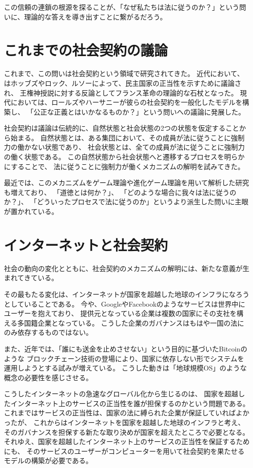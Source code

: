   この信頼の連鎖の根源を探ることが、「なぜ私たちは法に従うのか？」という問いに、理論的な答えを導き出すことに繋がるだろう。
  

  \section{これまでの社会契約の議論} %
  これまで、この問いは社会契約という領域で研究されてきた。
  近代において、はホッブズやロック、ルソーによって、民主国家の正当性を示すために議論され、
  王権神授説に対する反論としてフランス革命の理論的な石杖となった。
  現代においては、ロールズやハーサニーが彼らの社会契約を一般化したモデルを構築し、
  「公正な正義とはいかなるものか？」という問いへの議論に発展した。

  社会契約は議論は伝統的に、自然状態と社会状態の2つの状態を仮定することから始まる。
  自然状態とは、ある集団において、その成員が法に従うことに強制力の働かない状態であり、
  社会状態とは、全ての成員が法に従うことに強制力の働く状態である。
  この自然状態から社会状態へと遷移するプロセスを明らかにすることで、
  法に従うことに強制力が働くメカニズムの解明を試みてきた。

  最近では、このメカニズムをゲーム理論や進化ゲーム理論を用いて解析した研究も増えており、
  「道徳とは何か？」、
  「どのような場合に我々は法に従うのか？」、
  「どういったプロセスで法に従うのか」というより派生した問いに主眼が置かれている。


  \section{インターネットと社会契約} %
  社会の動向の変化とともに、社会契約のメカニズムの解明には、新たな意義が生まれてきている。

  その最もたる変化は、インターネットが国家を超越した地球のインフラになろうとしていることである。
  今や、GoogleやFacebookのようなサービスは世界中にユーザーを抱えており、
  提供元となっている企業は複数の国家にその支社を構える多国籍企業となっている。
  こうした企業のガバナンスはもはや一国の法にのみ依存するものではない。

  また、近年では、「誰にも送金を止めさせない」という目的に基づいたBitcoinのような
  ブロックチェーン技術の登場により、国家に依存しない形でシステムを運用しようとする試みが増えている。
  こうした動きは「地球規模OS」のような概念の必要性を感じさせる。
  
  こうしたインターネットの急速なグローバル化から生じるのは、
  国家を超越したインターネット上のサービスの正当性を誰が担保するのかという問題である。
  これまではサービスの正当性は、国家の法に縛られた企業が保証していればよかったが、
  これからはインターネットを国家を超越した地球のインフラと考え、
  そのガバナンスを担保する新たな取り決めが国家を超えたところで必要となる。
  それゆえ、国家を超越したインターネット上のサービスの正当性を保証するためにも、
  そのサービスのユーザーがコンピューターを用いて社会契約を果たせるモデルの構築が必要である。


